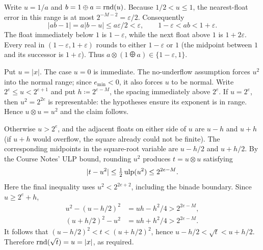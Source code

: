 \documentclass[11pt,oneside]{article}
\begin{document}
\begin{solution}
\begin{problemsubparts}
\item Write $u=1/a$ and $b=1\odiv a=\rnd(u)$.
Because $1/2<u\le1$, the nearest-float error in this range is at most
$2^{-M-2}=\varepsilon/2$. Consequently
\[
 |ab-1|=a|b-u|\le a\varepsilon/2<\varepsilon,
 \qquad 1-\varepsilon<ab<1+\varepsilon.
\]
The float immediately below $1$ is $1-\varepsilon$, while
the next float above $1$ is $1+2\varepsilon$.
Every real in $(1-\varepsilon, 1+\varepsilon)$ rounds to either
$1-\varepsilon$ or $1$ (the midpoint between $1$ and its
successor is $1+\varepsilon$). Thus
$a\otimes(1\odiv a)\in\{1-\varepsilon, 1\}$.

\item Put $u=|x|$. The case $u=0$ is immediate.
The no-underflow assumption forces $u^2$ into the normal range;
since $e_{\min}<0$, it also forces $u$ to be normal.
Write $2^e\le u<2^{e+1}$ and put
$h\coloneqq2^{e-M}$, the spacing immediately above $2^e$.
If $u=2^e$, then $u^2=2^{2e}$ is representable: the hypotheses
ensure its exponent is in range. Hence $u\otimes u=u^2$ and the
claim follows.

Otherwise $u>2^e$, and the adjacent floats on either side of $u$
are $u-h$ and $u+h$ (if $u+h$ would overflow, the square
already could not be finite). The corresponding midpoints in the
square-root variable are $u-h/2$ and $u+h/2$. By the Course Notes'
ULP bound, rounding $u^2$ produces $t=u\otimes u$ satisfying
\[
 |t-u^2|\le\tfrac12\operatorname{ulp}(u^2)\le2^{2e-M}.
\]
Here the final inequality uses $u^2<2^{2e+2}$, including the
binade boundary. Since $u\ge2^e+h$,
\[
 \begin{aligned}
 u^2-(u-h/2)^2&=uh-h^2/4>2^{2e-M}, \\
 (u+h/2)^2-u^2&=uh+h^2/4>2^{2e-M}.
 \end{aligned}
\]
It follows that
$(u-h/2)^2<t<(u+h/2)^2$, hence
$u-h/2<\sqrt t<u+h/2$. Therefore
$\operatorname{rnd}(\sqrt t)=u=|x|$, as required.
\end{problemsubparts}
\end{solution}
\end{document}
